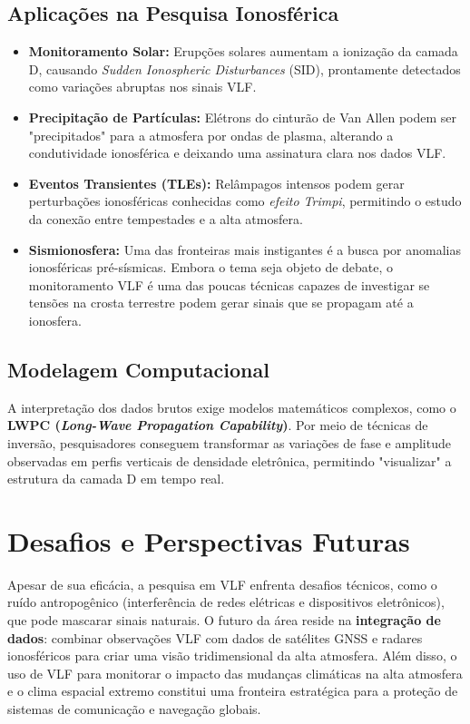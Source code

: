 \documentclass[12pt,a4paper]{article}
\begin{document}
\subsection{Aplicações na Pesquisa Ionosférica}
\begin{itemize}
    \item \textbf{Monitoramento Solar:} Erupções solares aumentam a ionização da camada D, causando \textit{Sudden Ionospheric Disturbances} (SID), prontamente detectados como variações abruptas nos sinais VLF.
    \item \textbf{Precipitação de Partículas:} Elétrons do cinturão de Van Allen podem ser "precipitados" para a atmosfera por ondas de plasma, alterando a condutividade ionosférica e deixando uma assinatura clara nos dados VLF.
    \item \textbf{Eventos Transientes (TLEs):} Relâmpagos intensos podem gerar perturbações ionosféricas conhecidas como \textit{efeito Trimpi}, permitindo o estudo da conexão entre tempestades e a alta atmosfera.
    \item \textbf{Sismionosfera:} Uma das fronteiras mais instigantes é a busca por anomalias ionosféricas pré-sísmicas. Embora o tema seja objeto de debate, o monitoramento VLF é uma das poucas técnicas capazes de investigar se tensões na crosta terrestre podem gerar sinais que se propagam até a ionosfera.
\end{itemize}

\subsection{Modelagem Computacional}
A interpretação dos dados brutos exige modelos matemáticos complexos, como o \textbf{LWPC (\textit{Long-Wave Propagation Capability})}. Por meio de técnicas de inversão, pesquisadores conseguem transformar as variações de fase e amplitude observadas em perfis verticais de densidade eletrônica, permitindo "visualizar" a estrutura da camada D em tempo real.

\section{Desafios e Perspectivas Futuras}

Apesar de sua eficácia, a pesquisa em VLF enfrenta desafios técnicos, como o ruído antropogênico (interferência de redes elétricas e dispositivos eletrônicos), que pode mascarar sinais naturais. O futuro da área reside na \textbf{integração de dados}: combinar observações VLF com dados de satélites GNSS e radares ionosféricos para criar uma visão tridimensional da alta atmosfera. Além disso, o uso de VLF para monitorar o impacto das mudanças climáticas na alta atmosfera e o clima espacial extremo constitui uma fronteira estratégica para a proteção de sistemas de comunicação e navegação globais.
\end{document}
